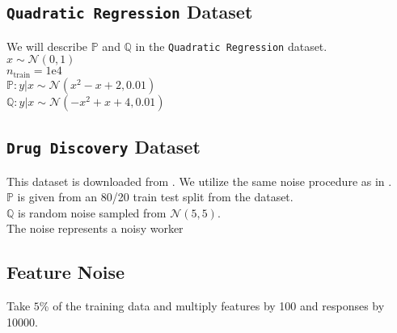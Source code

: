 \documentclass{article} %
\begin{document}
\begin{appendices}
	\subsection{\texttt{Quadratic Regression} Dataset}
	We will describe $\mathbb{P}$ and $\mathbb{Q}$ in the \texttt{Quadratic Regression} dataset.\\
	$x \sim \mathcal{N}(0,1)$\\
	$n_{\text{train}} = 1\text{e}4$\\
	$\mathbb{P}: y|x \sim \mathcal{N}(x^2 - x + 2, 0.01)$\\
	$\mathbb{Q}: y|x \sim \mathcal{N}(-x^2 + x + 4, 0.01)$
	
	\subsection{\texttt{Drug Discovery} Dataset}
	This dataset is downloaded from \cite{DiakonikolasKKLSS19}. We utilize the same noise procedure as in \cite{li2020tilted}.\\
	$\mathbb{P}$ is given from an 80/20 train test split from the dataset. \\
	$\mathbb{Q}$ is random noise sampled from $\mathcal{N}(5,5)$.\\
	The noise represents a noisy worker
		
	\subsection{Feature Noise}
	Take $5$\% of the training data and multiply features by 100 and responses by 10000. 
	
	\end{appendices}
\end{document}
